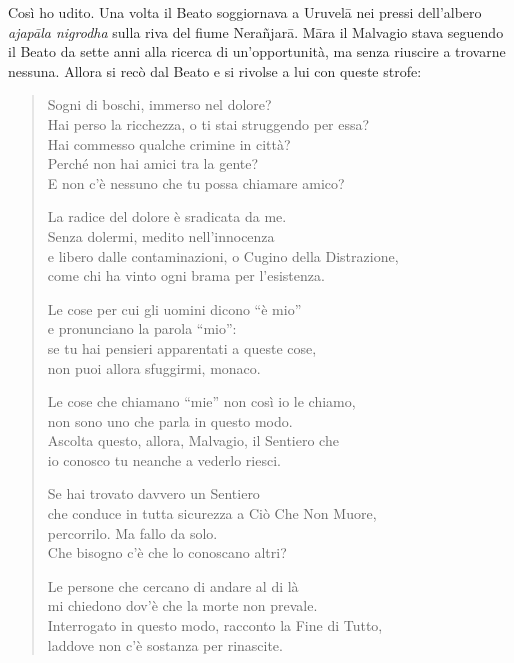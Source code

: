  Così ho udito. Una volta il Beato soggiornava a Uruvelā nei
pressi dell’albero \emph{ajapāla nigrodha} sulla riva del fiume Nerañjarā. Māra
il Malvagio stava seguendo il Beato da sette anni alla ricerca di
un’opportunità, ma senza riuscire a trovarne nessuna. Allora si recò dal Beato e
si rivolse a lui con queste strofe:

\begin{quote}
Sogni di boschi, immerso nel dolore? \\
Hai perso la ricchezza, o ti stai struggendo per essa? \\
Hai commesso qualche crimine in città? \\
Perché non hai amici tra la gente? \\
E non c’è nessuno che tu possa chiamare amico?

La radice del dolore è sradicata da me. \\
Senza dolermi, medito nell’innocenza \\
e libero dalle contaminazioni, o Cugino della Distrazione, \\
come chi ha vinto ogni brama per l’esistenza.

Le cose per cui gli uomini dicono “è mio” \\
e pronunciano la parola “mio”: \\
se tu hai pensieri apparentati a queste cose, \\
non puoi allora sfuggirmi, monaco.

Le cose che chiamano “mie” non così io le chiamo, \\
non sono uno che parla in questo modo. \\
Ascolta questo, allora, Malvagio, il Sentiero che \\
io conosco tu neanche a vederlo riesci.

Se hai trovato davvero un Sentiero \\
che conduce in tutta sicurezza a Ciò Che Non Muore, \\
percorrilo. Ma fallo da solo. \\
Che bisogno c’è che lo conoscano altri?

Le persone che cercano di andare al di là \\
mi chiedono dov’è che la morte non prevale. \\
Interrogato in questo modo, racconto la Fine di Tutto, \\
laddove non c’è sostanza per rinascite.
\end{quote}

